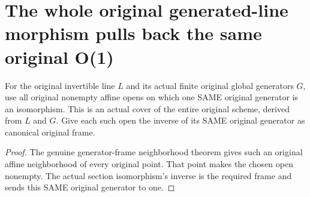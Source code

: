 \section{The whole original generated-line morphism pulls back the same original O(1)}

\begin{definition}
\label{def:fc-generated-line-projective-generator-cover}
\leanok
{}
For the original invertible line $L$ and its actual finite original
global generators $G$, use all original nonempty affine opens on
which one SAME original generator is an isomorphism. This is an
actual cover of the entire original scheme, derived from $L$ and
$G$. Give each such open the inverse of its SAME original generator
as canonical original frame.
\end{definition}
\begin{proof}
The genuine generator-frame neighborhood theorem gives such an
original affine neighborhood of every original point. That point
makes the chosen open nonempty. The actual section isomorphism's
inverse is the required frame and sends this SAME original
generator to one.
\end{proof}

